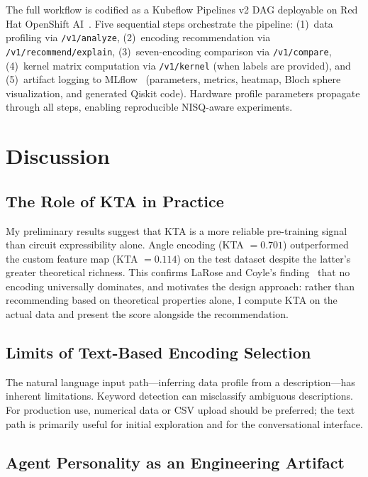 \documentclass[sigconf,nonacm]{acmart}
\begin{document}
The full workflow is codified as a Kubeflow Pipelines v2 DAG deployable on Red Hat
OpenShift AI~\cite{rhoai2026}. Five sequential steps orchestrate the pipeline:
(1)~data profiling via \texttt{/v1/analyze},
(2)~encoding recommendation via \texttt{/v1/recommend/explain},
(3)~seven-encoding comparison via \texttt{/v1/compare},
(4)~kernel matrix computation via \texttt{/v1/kernel} (when labels are provided),
and (5)~artifact logging to MLflow~\cite{zaharia2018} (parameters, metrics,
heatmap, Bloch sphere visualization, and generated Qiskit code).
Hardware profile parameters propagate through all steps,
enabling reproducible NISQ-aware experiments.

\section{Discussion}

\subsection{The Role of KTA in Practice}

My preliminary results suggest that KTA is a more reliable pre-training signal than
circuit expressibility alone. Angle encoding (KTA $= 0.701$) outperformed the
custom feature map (KTA $= 0.114$) on the test dataset despite the latter's greater
theoretical richness. This confirms LaRose and Coyle's finding~\cite{larose2020}
that no encoding universally dominates, and motivates the design approach: rather
than recommending based on theoretical properties alone, I compute KTA on the actual
data and present the score alongside the recommendation.

\subsection{Limits of Text-Based Encoding Selection}

The natural language input path---inferring data profile from a description---has
inherent limitations. Keyword detection can misclassify ambiguous descriptions. For
production use, numerical data or CSV upload should be preferred; the text path is
primarily useful for initial exploration and for the conversational interface.

\subsection{Agent Personality as an Engineering Artifact}
\end{document}
